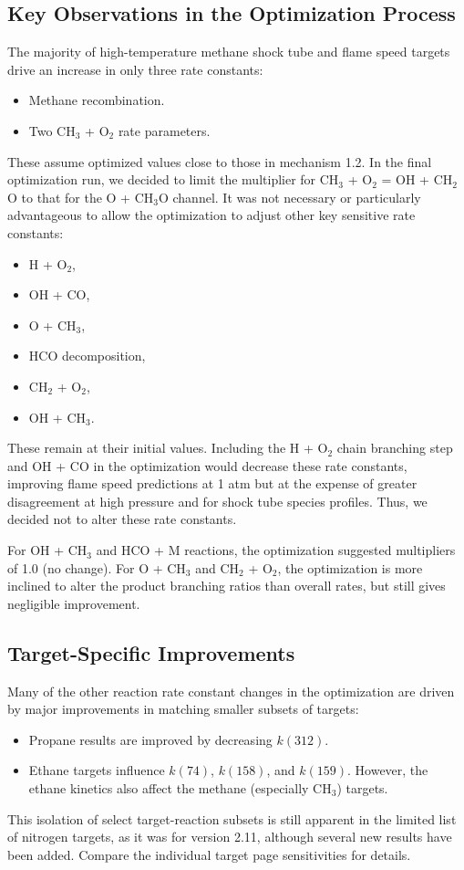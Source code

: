 \subsection*{Key Observations in the Optimization Process}
The majority of high-temperature methane shock tube and flame speed targets drive an increase in only three rate constants:
\begin{itemize}
    \item Methane recombination.
    \item Two CH$_3$ + O$_2$ rate parameters.
\end{itemize}
These assume optimized values close to those in mechanism 1.2. In the final optimization run, we decided to limit the multiplier for CH$_3$ + O$_2$ = OH + CH$_2$O to that for the O + CH$_3$O channel. It was not necessary or particularly advantageous to allow the optimization to adjust other key sensitive rate constants:
\begin{itemize}
    \item H + O$_2$,
    \item OH + CO,
    \item O + CH$_3$,
    \item HCO decomposition,
    \item CH$_2$ + O$_2$,
    \item OH + CH$_3$.
\end{itemize}
These remain at their initial values. Including the H + O$_2$ chain branching step and OH + CO in the optimization would decrease these rate constants, improving flame speed predictions at 1 atm but at the expense of greater disagreement at high pressure and for shock tube species profiles. Thus, we decided not to alter these rate constants.

For OH + CH$_3$ and HCO + M reactions, the optimization suggested multipliers of 1.0 (no change). For O + CH$_3$ and CH$_2$ + O$_2$, the optimization is more inclined to alter the product branching ratios than overall rates, but still gives negligible improvement.

\subsection*{Target-Specific Improvements}
Many of the other reaction rate constant changes in the optimization are driven by major improvements in matching smaller subsets of targets:
\begin{itemize}
    \item Propane results are improved by decreasing $k(312)$.
    \item Ethane targets influence $k(74)$, $k(158)$, and $k(159)$. However, the ethane kinetics also affect the methane (especially CH$_3$) targets.
\end{itemize}
This isolation of select target-reaction subsets is still apparent in the limited list of nitrogen targets, as it was for version 2.11, although several new results have been added. Compare the individual target page sensitivities for details.

